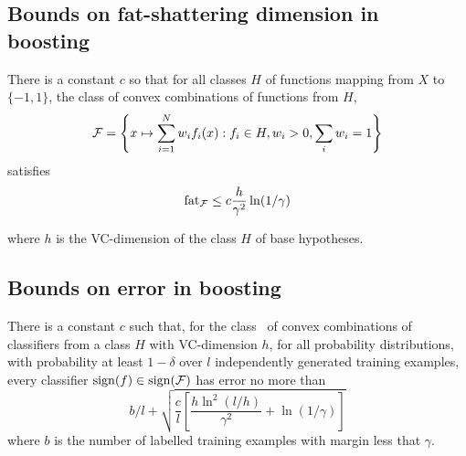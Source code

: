 \subsection{Bounds on fat-shattering dimension in boosting}

There is a constant $c$ so that for all classes $H$ of functions
mapping from $X$ to $\{-1, 1\}$, the class of convex combinations of
functions from $H$,
\begin{equation}
\mathcal{F} = \left\{
	x \mapsto \sum_{i=1}^N w_i f_i(x) : f_i \in H, w_i > 0, \sum_i
	w_i = 1
\right\}
\end{equation}
satisfies
\begin{equation}
\mathrm{fat}_{\mathcal{F}} \leq c \frac{h}{\gamma^2} \ln (1/\gamma)
\end{equation}

where $h$ is the VC-dimension of the class $H$ of base hypotheses.

\subsection{Bounds on error in boosting}

There is a constant $c$ such that, for the class \calF\ of convex
combinations of classifiers from a class $H$ with VC-dimension $h$,
for all probability distributions, with probability at least
$1-\delta$ over $l$ independently generated training examples, every
classifier $\mathrm{sign}(f) \in \mathrm{sign}(\mathcal{F})$ has error no more than
\begin{equation}
b/l + \sqrt{\frac{c}{l} \left[ \frac{h \ln^2 (l/h)}{\gamma^2} +
\ln(1/\gamma) \right] }
\end{equation}
where $b$ is the number of labelled training examples with margin less
that $\gamma$.


